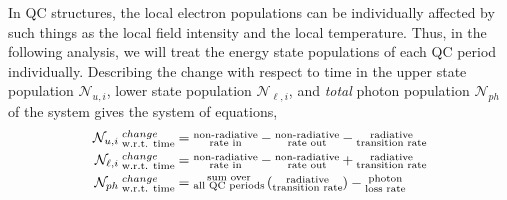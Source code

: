 {In QC structures, the local electron populations can be individually affected by such things as the local field intensity and the local temperature.  Thus, in the following analysis, we will treat the energy state populations of each QC period individually.  Describing the change with respect to time in the upper state population $\mathcal{N}_{u,i}$, lower state population $\mathcal{N}_{\ell,i}$, and \emph{total} photon population $\mathcal{N}_{ph}$ of the system gives the system of equations,
\begin{subequations}
\label{chpt1eqn:req_words}
\begin{align}
\mathcal{N}_{u,i}\: \begin{subarray} \tn{change}\\\tn{w.r.t. time}\end{subarray} &= \begin{subarray}{c}\tn{non-radiative}\\\tn{rate in}\end{subarray} - \begin{subarray}{c}\tn{non-radiative}\\\tn{rate out}\end{subarray} - \begin{subarray}{c}\tn{radiative}\\\tn{transition rate}\end{subarray}\\
\mathcal{N}_{\ell,i}\: \begin{subarray} \tn{change}\\\tn{w.r.t. time}\end{subarray} &= \begin{subarray}{c}\tn{non-radiative}\\\tn{rate in}\end{subarray} - \begin{subarray}{c}\tn{non-radiative}\\\tn{rate out}\end{subarray} + \begin{subarray}{c}\tn{radiative}\\\tn{transition rate}\end{subarray}\\
\mathcal{N}_{ph}\: \begin{subarray} \tn{change}\\\tn{w.r.t. time}\end{subarray} &= \begin{subarray}{c}\tn{sum over}\\\tn{all QC periods}\end{subarray} \left(\begin{subarray}{c}\tn{radiative}\\\tn{transition rate}\end{subarray}\right) - \begin{subarray}{c}\tn{photon}\\\tn{loss rate}\end{subarray}

\end{align}
\end{subequations}}
